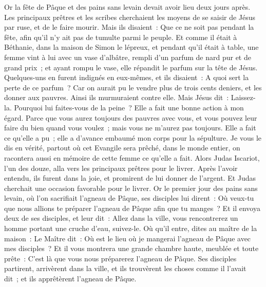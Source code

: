 \begin{multicols}{2}
\VerseOne{}Or la fête de Pâque et des pains sans levain devait avoir lieu deux jours après. Les principaux prêtres et les scribes cherchaient les moyens de se saisir de Jésus par ruse, et de le faire mourir.
Mais ils disaient~: Que ce ne soit pas pendant la fête, afin qu'il n'y ait pas de tumulte parmi le peuple.
Et comme il était à Béthanie, dans la maison de Simon le lépreux, et pendant qu'il était à table, une femme vint à lui avec un vase d'albâtre, rempli d'un parfum de nard pur et de grand prix~; et ayant rompu le vase, elle répandit le parfum sur la tête de Jésus.
Quelques-uns en furent indignés en eux-mêmes, et ils disaient~: A quoi sert la perte de ce parfum~?
Car on aurait pu le vendre plus de trois cents deniers, et les donner aux pauvres. Ainsi ils murmuraient contre elle.
Mais Jésus dit~: Laissez-la. Pourquoi lui faites-vous de la peine~? Elle a fait une bonne action à mon égard.
Parce que vous aurez toujours des pauvres avec vous, et vous pouvez leur faire du bien quand vous voulez~; mais vous ne m'aurez pas toujours.
Elle a fait ce qu'elle a pu~; elle a d'avance embaumé mon corps pour la sépulture.
Je vous le dis en vérité, partout où cet Evangile sera prêché, dans le monde entier, on racontera aussi en mémoire de cette femme ce qu'elle a fait.
Alors Judas Iscariot, l'un des douze, alla vers les principaux prêtres pour le livrer.
Après l'avoir entendu, ils furent dans la joie, et promirent de lui donner de l'argent. Et Judas cherchait une occasion favorable pour le livrer.
Or le premier jour des pains sans levain, où l'on sacrifiait l'agneau de Pâque, ses disciples lui dirent~: Où veux-tu que nous allions te préparer l'agneau de Pâque afin que tu manges~?
Et il envoya deux de ses disciples, et leur dit~: Allez dans la ville, vous rencontrerez un homme portant une cruche d'eau, suivez-le.
Où qu'il entre, dites au maître de la maison~: Le Maître dit~: Où est le lieu où je mangerai l'agneau de Pâque avec mes disciples~?
Et il vous montrera une grande chambre haute, meublée et toute prête~: C'est là que vous nous préparerez l'agneau de Pâque.
Ses disciples partirent, arrivèrent dans la ville, et ils trouvèrent les choses comme il l'avait dit~; et ils apprêtèrent l'agneau de Pâque.

\end{multicols}
